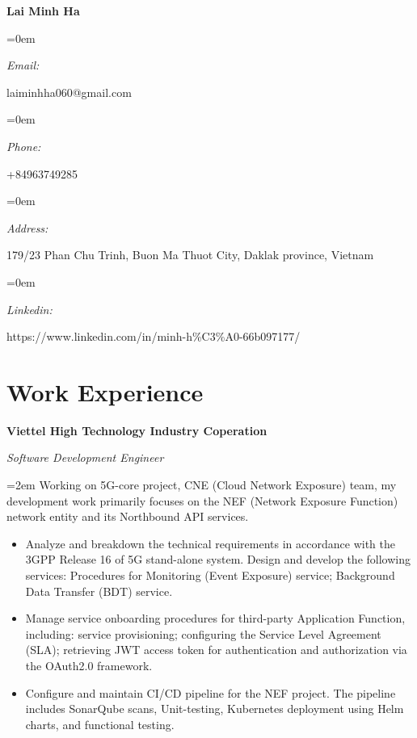 \documentclass[10pt]{article}
\newlength{\spacebox}
\newcommand{\name}[1]{
\Huge %
\fontfamily{phv}\selectfont %
\begin{center} \textbf{#1} \end{center}\par
\normalsize\normalfont}
\newcommand{\motto}[1]{
  \large %
  \fontfamily{phv}\selectfont %
  \begin{center} \textsl{#1}\end{center}\par
  \normalsize \normalfont}
\newcommand{\info}[2]{
  \noindent\hangindent=0em\hangafter=0
  \parbox{\spacebox}{%
  \textit{#1}} %
  #2 \par} %
\newcommand{\work}[4]{
  \noindent  \textbf{#1}
  \hfill 
\framebox{%
  \parbox{9em}{%
  \centering\textbf{#2}}} \par
  \noindent \textit{#3} \par
  \vspace*{0.5em}
  \noindent\hangindent=2em\hangafter=0 \small #4 
\normalsize \par}
\begin{document}
\name{Lai Minh Ha}
\vspace*{-13pt}
\motto{}

\info{Email:}{laiminhha060@gmail.com}
\info{Phone:}{+84963749285}
\info{Address:}{179/23 Phan Chu Trinh, Buon Ma Thuot City, Daklak province, Vietnam}
\info{Linkedin:}{https://www.linkedin.com/in/minh-h\%C3\%A0-66b097177/}

\section*{Work Experience}
\work{Viettel High Technology Industry Coperation}
{May 2023--Now}
{Software Development Engineer}
{Working on 5G-core project, CNE (Cloud Network Exposure) team, my development work primarily focuses on the NEF (Network Exposure Function) network entity and its Northbound API services.

\begin{itemize}
    \item Analyze and breakdown the technical requirements in accordance with the 3GPP Release 16 of 5G stand-alone system.
     Design and develop the following services: Procedures for Monitoring (Event Exposure) service; %
     Background Data Transfer (BDT) service.
    \item Manage service onboarding procedures for third-party Application Function, including: service provisioning; configuring the Service Level Agreement (SLA); retrieving JWT access token for authentication and authorization via the OAuth2.0 framework.
    \item Configure and maintain CI/CD pipeline for the NEF project. The pipeline includes SonarQube scans, Unit-testing, Kubernetes deployment using Helm charts, and functional testing.
\end{itemize}}
\end{document}
